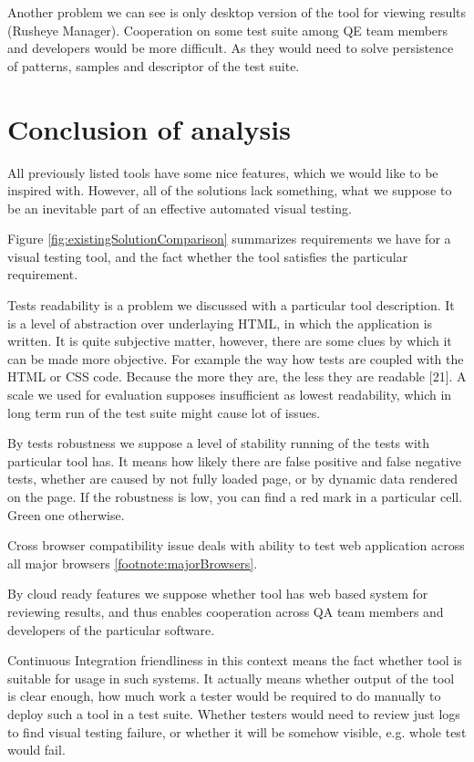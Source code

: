 \documentclass[11pt,oneside,final]{fithesis2}
\begin{document}
  Another problem we can see is only desktop version of the tool for viewing results (Rusheye Manager). Cooperation on some test suite among QE team members and developers would be 
  more difficult. As they would need to solve persistence of patterns, samples and descriptor of the test suite.
  
  \section{Conclusion of analysis}
  All previously listed tools have some nice features, which we would like to be inspired with. However, all of the solutions lack something, what we suppose to be an inevitable part of 
  an effective automated visual testing.
  
  Figure \ref{fig:existingSolutionComparison} summarizes requirements we have for a visual testing tool, and the fact whether the tool satisfies the particular requirement.
  
  Tests readability is a problem we discussed with a particular tool description. It is a level of abstraction over underlaying HTML, in which the application is written. It is quite subjective
  matter, however, there are some clues by which it can be made more objective. For example the way how tests are coupled with the HTML or CSS code. Because the more they are, the less they 
  are readable [21]. A scale we used for evaluation supposes insufficient as lowest readability, which in long term run of the test suite might cause lot of issues.
  
  By tests robustness we suppose a level of stability running of the tests with particular tool has. 
  It means how likely there are false positive and false negative tests, whether are caused by not fully loaded page, or by dynamic data rendered on the page. If the robustness is low,
  you can find a red mark in a particular cell. Green one otherwise.
  
  Cross browser compatibility issue deals with ability to test web application across all major browsers \ref{footnote:majorBrowsers}.
  
  By cloud ready features we suppose whether tool has web based system for reviewing results, and thus enables cooperation across QA team members and developers of the particular software.
  
  Continuous Integration friendliness in this context means the fact whether tool is suitable for usage in such systems. It actually means whether output of the tool is clear enough,
  how much work a tester would be required to do manually to deploy such a tool in a test suite. Whether testers would need to review just logs to find visual testing failure, or
  whether it will be somehow visible, e.g. whole test would fail.
  
\end{document}
